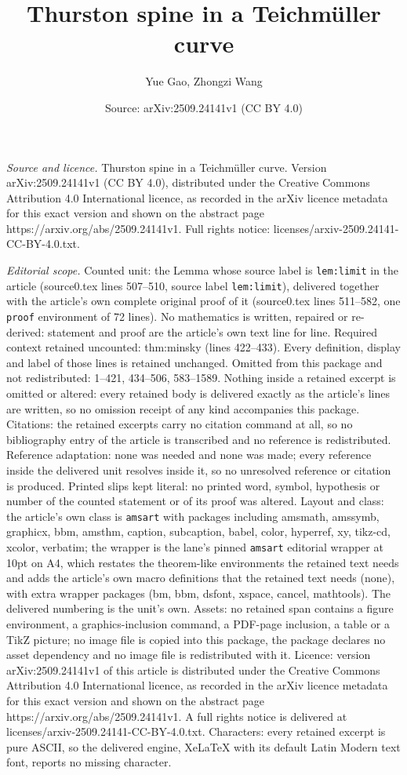 \documentclass[10pt,a4paper]{amsart}
\title[Thurston spine in a Teichm\"uller curve]{Thurston spine in a Teichm\"uller curve}
\author{Yue Gao, Zhongzi Wang}
\date{Source: arXiv:2509.24141v1 (CC BY 4.0)}
\begin{document}
\maketitle

\noindent\emph{Source and licence.} Thurston spine in a Teichm\"uller curve. Version arXiv:2509.24141v1 (CC BY 4.0), distributed under the Creative Commons Attribution 4.0 International licence, as recorded in the arXiv licence metadata for this exact version and shown on the abstract page https://arxiv.org/abs/2509.24141v1. Full rights notice: licenses/arxiv-2509.24141-CC-BY-4.0.txt.\par\smallskip

\noindent\textit{Editorial scope.} Counted unit: the Lemma whose source label is \texttt{lem:limit} in the article (source0.tex lines 507--510, source label \texttt{lem:limit}), delivered together with the article's own complete original proof of it (source0.tex lines 511--582, one \texttt{proof} environment of 72 lines). No mathematics is written, repaired or re-derived: statement and proof are the article's own text line for line. Required context retained uncounted: thm:minsky (lines 422--433). Every definition, display and label of those lines is retained unchanged. Omitted from this package and not redistributed: 1--421, 434--506, 583--1589. Nothing inside a retained excerpt is omitted or altered: every retained body is delivered exactly as the article's lines are written, so no omission receipt of any kind accompanies this package. Citations: the retained excerpts carry no citation command at all, so no bibliography entry of the article is transcribed and no reference is redistributed. Reference adaptation: none was needed and none was made; every reference inside the delivered unit resolves inside it, so no unresolved reference or citation is produced. Printed slips kept literal: no printed word, symbol, hypothesis or number of the counted statement or of its proof was altered. Layout and class: the article's own class is \texttt{amsart} with packages including amsmath, amssymb, graphicx, bbm, amsthm, caption, subcaption, babel, color, hyperref, xy, tikz-cd, xcolor, verbatim; the wrapper is the lane's pinned \texttt{amsart} editorial wrapper at 10pt on A4, which restates the theorem-like environments the retained text needs and adds the article's own macro definitions that the retained text needs (none), with extra wrapper packages (bm, bbm, dsfont, xspace, cancel, mathtools). The delivered numbering is the unit's own. Assets: no retained span contains a figure environment, a graphics-inclusion command, a PDF-page inclusion, a table or a TikZ picture; no image file is copied into this package, the package declares no asset dependency and no image file is redistributed with it. Licence: version arXiv:2509.24141v1 of this article is distributed under the Creative Commons Attribution 4.0 International licence, as recorded in the arXiv licence metadata for this exact version and shown on the abstract page https://arxiv.org/abs/2509.24141v1. A full rights notice is delivered at licenses/arxiv-2509.24141-CC-BY-4.0.txt. Characters: every retained excerpt is pure ASCII, so the delivered engine, XeLaTeX with its default Latin Modern text font, reports no missing character.
\end{document}

